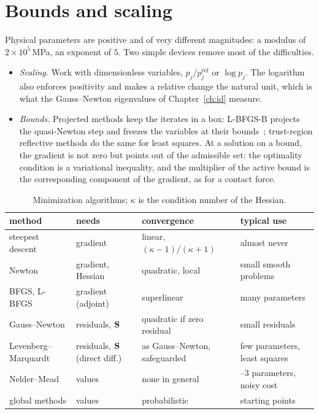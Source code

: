 \section{Bounds and scaling}\label{sec:opt-bounds}
%
Physical parameters are positive and of very different magnitudes: a modulus of
$2\times10^5$\,MPa, an exponent of $5$. Two simple devices remove most of the
difficulties.
\begin{itemize}
  \item \emph{Scaling.} Work with dimensionless variables, $p_j/p_j^{\mathrm{ref}}$ or
  $\log p_j$. The logarithm also enforces positivity and makes a relative change the
  natural unit, which is what the Gauss--Newton eigenvalues of Chapter~\ref{ch:id}
  measure.
  \item \emph{Bounds.} Projected methods keep the iterates in a box: L-BFGS-B
  projects the quasi-Newton step and freezes the variables at their
  bounds~\cite{ByrdLuNocedalZhu1995}; trust-region reflective methods do the same
  for least squares. At a solution on a bound, the gradient is not zero but points
  out of the admissible set: the optimality condition is a variational inequality,
  and the multiplier of the active bound is the corresponding component of the
  gradient, as for a contact force.
\end{itemize}

\begin{table}[h]
\centering\small
\renewcommand{\arraystretch}{1.15}
\begin{tabular}{@{}>{\raggedright}p{3.0cm}>{\raggedright}p{3.4cm}>{\raggedright}p{3.6cm}>{\raggedright\arraybackslash}p{3.6cm}@{}}
\toprule
\sffamily method & \sffamily needs & \sffamily convergence & \sffamily typical use\\
\midrule
steepest descent & gradient & linear, $(\kappa-1)/(\kappa+1)$ & almost never\\
Newton & gradient, Hessian & quadratic, local & small smooth problems\\
BFGS, L-BFGS & gradient (adjoint) & superlinear & many parameters\\
Gauss--Newton & residuals, $\mathbf{S}$ & quadratic if zero residual & small residuals\\
Levenberg--Marquardt & residuals, $\mathbf{S}$ (direct diff.) & as Gauss--Newton, safeguarded & few parameters, least squares\\
Nelder--Mead & values & none in general & 2--3 parameters, noisy cost\\
global methods & values & probabilistic & starting points\\
\bottomrule
\end{tabular}
\caption{Minimization algorithms; $\kappa$ is the condition number of the Hessian.}
\label{tab:opt-methods}
\end{table}

